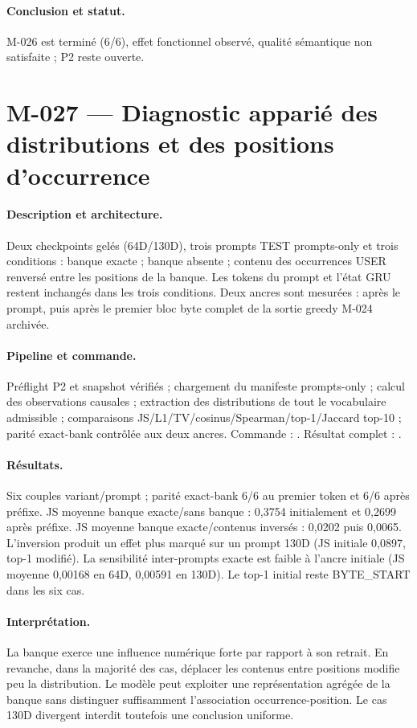 \documentclass[11pt,a4paper]{report}
\begin{document}
\paragraph{Conclusion et statut.} M-026 est terminé (6/6), effet fonctionnel observé, qualité sémantique non satisfaite ; P2 reste ouverte.


\section{M-027 — Diagnostic apparié des distributions et des positions d'occurrence}
\label{sec:m027-paired-logits}
\paragraph{Description et architecture.} Deux checkpoints gelés (64D/130D), trois prompts TEST prompts-only et trois conditions : banque exacte ; banque absente ; contenu des occurrences USER renversé entre les positions de la banque. Les tokens du prompt et l'état GRU restent inchangés dans les trois conditions. Deux ancres sont mesurées : après le prompt, puis après le premier bloc byte complet de la sortie greedy M-024 archivée.
\paragraph{Pipeline et commande.} Préflight P2 et snapshot vérifiés ; chargement du manifeste prompts-only ; calcul des observations causales ; extraction des distributions de tout le vocabulaire admissible ; comparaisons JS/L1/TV/cosinus/Spearman/top-1/Jaccard top-10 ; parité exact-bank contrôlée aux deux ancres. Commande : . Résultat complet : .
\paragraph{Résultats.} Six couples variant/prompt ; parité exact-bank 6/6 au premier token et 6/6 après préfixe. JS moyenne banque exacte/sans banque : 0,3754 initialement et 0,2699 après préfixe. JS moyenne banque exacte/contenus inversés : 0,0202 puis 0,0065. L'inversion produit un effet plus marqué sur un prompt 130D (JS initiale 0,0897, top-1 modifié). La sensibilité inter-prompts exacte est faible à l'ancre initiale (JS moyenne 0,00168 en 64D, 0,00591 en 130D). Le top-1 initial reste BYTE\_START dans les six cas.
\paragraph{Interprétation.} La banque exerce une influence numérique forte par rapport à son retrait. En revanche, dans la majorité des cas, déplacer les contenus entre positions modifie peu la distribution. Le modèle peut exploiter une représentation agrégée de la banque sans distinguer suffisamment l'association occurrence-position. Le cas 130D divergent interdit toutefois une conclusion uniforme.
\end{document}

